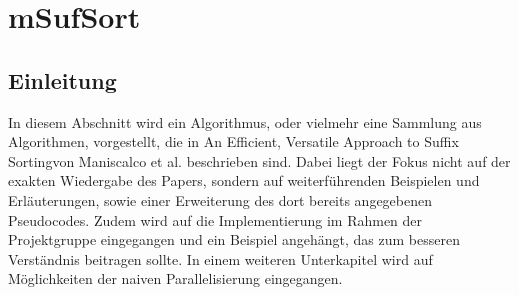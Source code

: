 \section{mSufSort}

\subsection{Einleitung}

In  diesem Abschnitt wird ein Algorithmus, oder vielmehr eine Sammlung aus Algorithmen, vorgestellt, die in \glqq An Efficient, Versatile Approach to Suffix Sorting\grqq von Maniscalco et al. \cite{saca:8} beschrieben sind. Dabei liegt der Fokus nicht auf der exakten Wiedergabe des Papers, sondern auf weiterführenden Beispielen und Erläuterungen, sowie einer Erweiterung des dort bereits angegebenen Pseudocodes. Zudem wird auf die Implementierung im Rahmen der Projektgruppe eingegangen und ein Beispiel angehängt, das zum besseren Verständnis beitragen sollte. In einem weiteren Unterkapitel wird auf Möglichkeiten der naiven Parallelisierung eingegangen.\\

